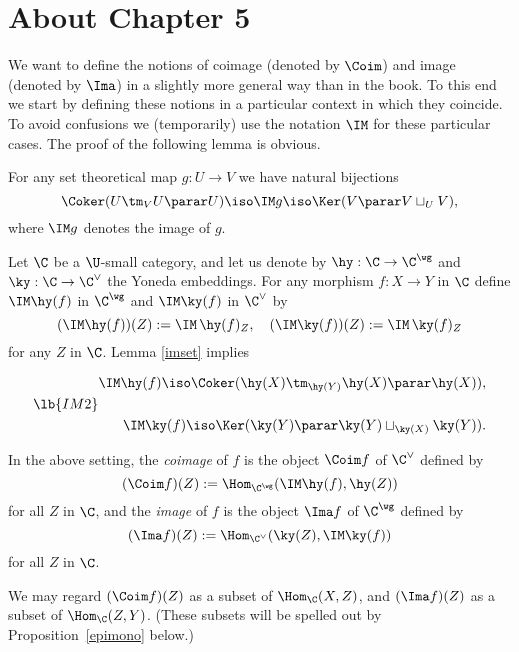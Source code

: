 \documentclass[12pt]{article}
\theoremstyle{remark}
\theoremstyle{definition}
\begin{document}

\section{About Chapter 5}


We want to define the notions of coimage (denoted by $\Coim$) and image (denoted by $\Ima$) in a slightly more general way than in the book. To this end we start by defining these notions in a particular context in which they coincide. To avoid confusions we (temporarily) use the notation $\IM$ for these particular cases. The proof of the following lemma is obvious. 

\begin{lem} 
For any set theoretical map $g:U\to V$ we have natural bijections 
$$ 
\Coker(U\tm_VU\parar U)\iso\IM g\iso\Ker(V\parar V\sqcup_UV),
$$ 
where $\IM g$ denotes the image of $g$. 
\end{lem} 

Let $\C$ be a $\U$-small category, and let us denote by $\hy:\C\to\C^\wg$ and $\ky:\C\to\C^\vee$ the Yoneda embeddings. For any morphism $f:X\to Y$ in $\C$ define $\IM\hy(f)$ in $\C^\wg$ and $\IM\ky(f)$ in $\C^\vee$ by
$$
(\IM\hy(f))(Z):=\IM\,\hy(f)_Z,\quad(\IM\ky(f))(Z):=\IM\,\ky(f)_Z 
$$
for any $Z$ in $\C$. Lemma \ref{imset} implies

\begin{equation}\lb{IM2}
\begin{split}
\IM\hy(f)\iso\Coker(\hy(X)\tm_{\hy(Y)}\hy(X)\parar\hy(X)),\\ \\ 
\IM\ky(f)\iso\Ker(\ky(Y)\parar\ky(Y)\sqcup_{\ky(X)}\ky(Y)).
\end{split}
\end{equation}

\begin{df}%
In the above setting, the {\em coimage} of $f$ is the object $\Coim f$ of $\C^\vee$ defined by 
$$ 
(\Coim f)(Z):=\Hom_{\C^\wg}(\IM\hy(f),\hy(Z))
$$ 
for all $Z$ in $\C$, and the {\em image} of $f$ is the object $\Ima f$ of $\C^\wg$ defined by 
$$ 
(\Ima f)(Z):=\Hom_{\C^\vee}(\ky(Z),\IM\ky(f)) 
$$ 
for all $Z$ in $\C$. 
\end{df} 

\begin{prop}
We may regard $(\Coim f)(Z)$ as a subset of $\Hom_\C(X,Z)$, and $(\Ima f)(Z)$ as a subset of $\Hom_\C(Z,Y)$. (These subsets will be spelled out by Proposition~\ref{epimono} below.)
\end{prop}
\end{document}
